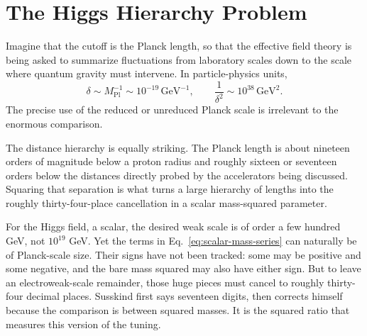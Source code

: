 \section{The Higgs Hierarchy Problem}

Imagine that the cutoff is the Planck length, so that the effective field
theory is being asked to summarize fluctuations from laboratory scales down
to the scale where quantum gravity must intervene.
In particle-physics units,
\begin{equation}
\delta\sim M_{\mathrm{Pl}}^{-1}\sim10^{-19}\,\mathrm{GeV}^{-1},
\qquad
\frac{1}{\delta^2}\sim10^{38}\,\mathrm{GeV}^2.
\label{eq:planck-cutoff}
\end{equation}
The precise use of the reduced or unreduced Planck scale is irrelevant to the
enormous comparison.

The distance hierarchy is equally striking. The Planck length is about
nineteen orders of magnitude below a proton radius and roughly sixteen or
seventeen orders below the distances directly probed by the accelerators
being discussed. Squaring that separation is what turns a large hierarchy of
lengths into the roughly thirty-four-place cancellation in a scalar
mass-squared parameter.

For the Higgs field, a scalar, the desired weak scale is of order a few
hundred GeV, not \(10^{19}\) GeV. Yet the terms in
Eq.~\eqref{eq:scalar-mass-series} can naturally be of Planck-scale size.
Their signs have not been tracked: some may be positive and some negative,
and the bare mass squared may also have either sign. But to leave an
electroweak-scale remainder, those huge pieces must cancel to roughly
thirty-four decimal places. Susskind first says seventeen digits, then
corrects himself because the comparison is between squared masses. It is the
squared ratio that measures this version of the tuning.

\begin{classroomqa}
\end{classroomqa}

\begin{classroomqa}
\end{classroomqa}

